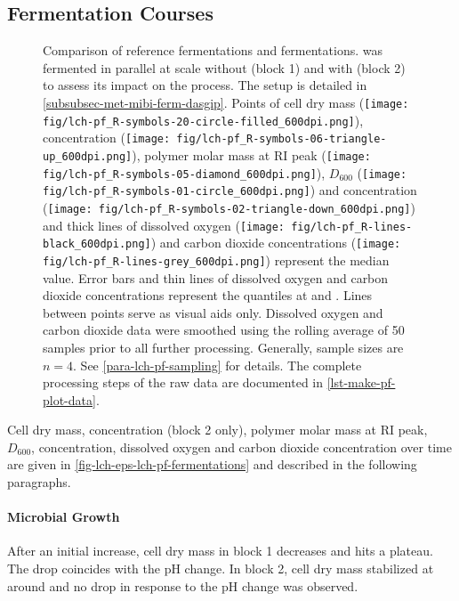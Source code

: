 \subsection{Fermentation Courses\label{subsec-lch-pf-fermentation-courses}}
\begin{figure}
	\hfill
	\caption[Comparison of Reference Fermentations and \LCH{} Fermentations]{
	Comparison of reference fermentations and \lch{} fermentations.
	\strain{} was fermented in parallel at  scale without (block 1) and with \lch{} (block 2) to assess its impact on the process.
	The setup is detailed in \vref{subsubsec-met-mibi-ferm-dasgip}.
	Points of cell dry mass (\texttt{[image: fig/lch-pf\_R-symbols-20-circle-filled\_600dpi.png]}),
	\fur{} concentration (\texttt{[image: fig/lch-pf\_R-symbols-06-triangle-up\_600dpi.png]}),
	polymer molar mass at RI peak (\texttt{[image: fig/lch-pf\_R-symbols-05-diamond\_600dpi.png]}),
	$D_{600}$ (\texttt{[image: fig/lch-pf\_R-symbols-01-circle\_600dpi.png]}) and
	\glc{} concentration (\texttt{[image: fig/lch-pf\_R-symbols-02-triangle-down\_600dpi.png]}) and
	thick lines of dissolved oxygen (\texttt{[image: fig/lch-pf\_R-lines-black\_600dpi.png]}) and
	carbon dioxide concentrations (\texttt{[image: fig/lch-pf\_R-lines-grey\_600dpi.png]})
	represent the median value.
	Error bars and thin lines of dissolved oxygen and carbon dioxide concentrations represent the quantiles at  and .
	Lines between points serve as visual aids only.
	Dissolved oxygen and carbon dioxide data were smoothed using the rolling average of 50 samples prior to all further processing.
	Generally, sample sizes are $n = 4$. See \vref{para-lch-pf-sampling} for details.
	The complete processing steps of the raw data are documented in \vref{lst-make-pf-plot-data}.
	\label{fig-lch-eps-lch-pf-fermentations}}
\end{figure}
Cell dry mass, \fur{} concentration (block 2 only), polymer molar mass at RI peak, $D_{600}$, \glc{} concentration, dissolved oxygen and carbon dioxide concentration over time are given in \vref{fig-lch-eps-lch-pf-fermentations} and described in the following paragraphs.

\paragraph{Microbial Growth}
After an initial increase, cell dry mass in block 1 decreases and hits a plateau. The drop coincides with the pH change. In block 2, cell dry mass stabilized at around  and no drop in response to the pH change was observed.

